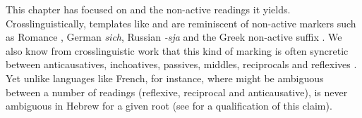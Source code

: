 {{This chapter has focused on {\vz} and the non-active readings it yields. Crosslinguistically, templates like {\tnif} and {\thit} are reminiscent of non-active markers such as Romance , German \emph{sich}, Russian \emph{-sja} and the Greek non-active suffix . We also know from crosslinguistic work that this kind of marking is often syncretic between anticausatives, inchoatives, passives, middles, reciprocals and reflexives \citep{geniusiene87,klaiman91,alexiadoudoron12}. Yet unlike languages like French, for instance, where  might be ambiguous between a number of readings (reflexive, reciprocal and anticausative), {\thit} is never ambiguous in Hebrew for a given root (see \citealt{kastner17gjgl} for a qualification of this claim).

%
%	
%
%
}}
